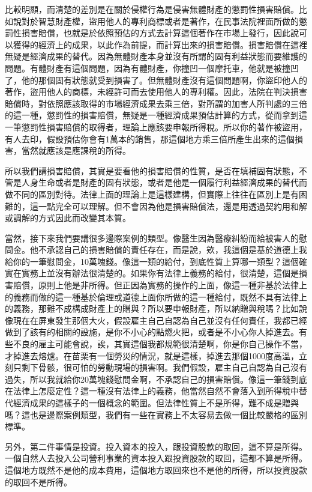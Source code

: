 \documentclass[]{ctexbook}
\begin{document}
比較明顯，而清楚的差別是在關於侵權行為是侵害無體財產的懲罰性損害賠償。比如說對於智慧財產權，盜用他人的專利商標或者是著作，在民事法院裡面所做的懲罰性損害賠償，也就是於依照預估的方式去計算這個著作在市場上發行，因此說可以獲得的經濟上的成果，以此作為前提，而計算出來的損害賠償。損害賠償在這裡無疑是經濟成果的替代。因為無體財產本身並沒有所謂的固有利益狀態而要維護的問題。有體財產有這個問題，因為有體財產，你撞凹一個摩托車，他就是被撞凹了，他的那個固有狀態就受到損害了。但無體財產沒有這個問題啊，你盜印他人的著作，盜用他人的商標，未經許可而去使用他人的專利權。因此，法院在判決損害賠償時，對依照應該取得的市場經濟成果去乘三倍，對所謂的加害人所判處的三倍的這一種，懲罰性的損害賠償，無疑是一種經濟成果預估計算的方式，從而拿到這一筆懲罰性損害賠償的取得者，理論上應該要申報所得稅。所以你的著作被盜用，有人去印，假設預估你會有1萬本的銷售，那這個地方乘三倍所產生出來的這個損害，當然就應該是應課稅的所得。

所以我們講損害賠償，其實是要看他的損害賠償的性質，是否在填補固有狀態，不管是人身生命或者是財產的固有狀態，或者是他是一個履行利益經濟成果的替代而做不同的區別對待。法律上面的理論上是這樣建構，但實際上往往在區別上是有困難的，這一點完全可以理解。但不會因為他是損害賠償法，還是用透過契約用和解或調解的方式因此而改變其本質。

當然，接下來我們要講很多邊際案例的類型。像醫生因為醫療糾紛而給被害人的慰問金。他不承認自己的損害賠償的責任存在，而是說，欸，我這個是基於道德上我給你的一筆慰問金，10萬塊錢。像這一類的給付，到底性質上算哪一類型？這個確實在實務上並沒有辦法很清楚的。如果你有法律上義務的給付，很清楚，這個是損害賠償，原則上他是非所得。但正因為實務的操作的上面，像這一種非基於法律上的義務而做的這一種基於倫理或道德上面你所做的這一種給付，既然不具有法律上的義務，那難不成構成財產上的贈與？所以要申報財產，所以納贈與稅嗎？比如說像現在在屏東發生那個大火，假設雇主自己自認為自己並沒有任何責任，我都已經做到了該有的相關的設施，是你不小心的點燃火把，或者是不小心你人掉進去。有些不良的雇主可能會說，誒，其實這個我都規範很清楚啊，你是你自己操作不當，才掉進去熔爐。在苗栗有一個勞災的情況，就是這樣，掉進去那個1000度高溫，立刻只剩下骨骸，很可怕的勞動現場的損害啊。我們假設，雇主自己自認為自己沒有過失，所以我就給你20萬塊錢慰問金啊，不承認自己的損害賠償。像這一筆錢到底在法律上怎麼定性？這一種沒有法律上的義務，他當然自然不會落入到所得稅中替代經濟成果的這樣子的一個概念的範圍。但法律性質上不是所得，難不成是贈與嗎？這也是邊際案例類型，我們有一些在實務上不太容易去做一個比較嚴格的區別標準。

另外，第二件事情是投資。投入資本的投入，跟投資股款的取回，這不算是所得。一個自然人去投入公司營利事業的資本投入跟投資股款的取回，這都不算是所得。這個地方既然不是他的成本費用，這個地方取回來也不是他的所得，所以投資股款的取回不是所得。
\end{document}
